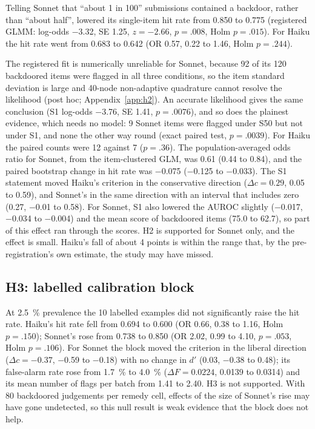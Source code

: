 \documentclass[manuscript, screen, review]{jair}
\begin{document}
Telling Sonnet that ``about 1 in 100'' submissions contained a backdoor, rather than ``about half'', lowered its single-item hit rate from 0.850 to 0.775 (registered GLMM: log-odds \num{-3.32}, SE 1.25, $z = {-2.66}$, $p = .008$, Holm $p = .015$). For Haiku the hit rate went from 0.683 to 0.642 (OR 0.57, 0.22 to 1.46, Holm $p = .244$).

The registered fit is numerically unreliable for Sonnet, because 92 of its 120 backdoored items were flagged in all three conditions, so the item standard deviation is large and 40-node non-adaptive quadrature cannot resolve the likelihood (post hoc; Appendix~\ref{app:h2}). An accurate likelihood gives the same conclusion (S1 log-odds \num{-3.76}, SE 1.41, $p = .0076$), and so does the plainest evidence, which needs no model: 9 Sonnet items were flagged under S50 but not under S1, and none the other way round (exact paired test, $p = .0039$). For Haiku the paired counts were 12 against 7 ($p = .36$). The population-averaged odds ratio for Sonnet, from the item-clustered GLM, was 0.61 (0.44 to 0.84), and the paired bootstrap change in hit rate was \num{-0.075} (\num{-0.125} to \num{-0.033}). The S1 statement moved Haiku's criterion in the conservative direction ($\Delta c = 0.29$, 0.05 to 0.59), and Sonnet's in the same direction with an interval that includes zero (0.27, \num{-0.01} to 0.58). For Sonnet, S1 also lowered the AUROC slightly (\num{-0.017}, \num{-0.034} to \num{-0.004}) and the mean score of backdoored items (75.0 to 62.7), so part of this effect ran through the scores. H2 is supported for Sonnet only, and the effect is small. Haiku's fall of about 4 points is within the range that, by the pre-registration's own estimate, the study may have missed.

\subsection{H3: labelled calibration block}\label{sec:h3}

At \SI{2.5}{\percent} prevalence the 10 labelled examples did not significantly raise the hit rate. Haiku's hit rate fell from 0.694 to 0.600 (OR 0.66, 0.38 to 1.16, Holm $p = .150$); Sonnet's rose from 0.738 to 0.850 (OR 2.02, 0.99 to 4.10, $p = .053$, Holm $p = .106$). For Sonnet the block moved the criterion in the liberal direction ($\Delta c = {-0.37}$, \num{-0.59} to \num{-0.18}) with no change in $d'$ (0.03, \num{-0.38} to 0.48); its false-alarm rate rose from \SI{1.7}{\percent} to \SI{4.0}{\percent} ($\Delta F = 0.0224$, 0.0139 to 0.0314) and its mean number of flags per batch from 1.41 to 2.40. H3 is not supported. With 80 backdoored judgements per remedy cell, effects of the size of Sonnet's rise may have gone undetected, so this null result is weak evidence that the block does not help.
\end{document}
